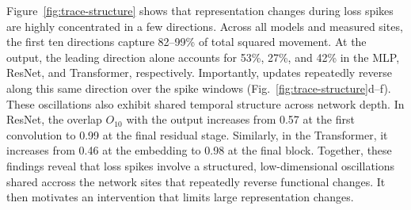 Figure~\ref{fig:trace-structure} shows that representation changes during loss spikes are highly concentrated in a few directions. Across all models and measured sites, the first ten directions capture 82--99\% of total squared movement. At the output, the leading direction alone accounts for 53\%, 27\%, and 42\% in the MLP, ResNet, and Transformer, respectively. Importantly, updates repeatedly reverse along this same direction over the spike windows (Fig.~\ref{fig:trace-structure}d--f). These oscillations also exhibit shared temporal structure across network depth. In ResNet, the overlap $O_{10}$ with the output increases from 0.57 at the first convolution to 0.99 at the final residual stage. Similarly, in the Transformer, it increases from 0.46 at the embedding to 0.98 at the final block. Together, these findings reveal that loss spikes involve a structured, low-dimensional oscillations shared accross the network sites that repeatedly reverse functional changes. It then motivates an intervention that limits large representation changes.

